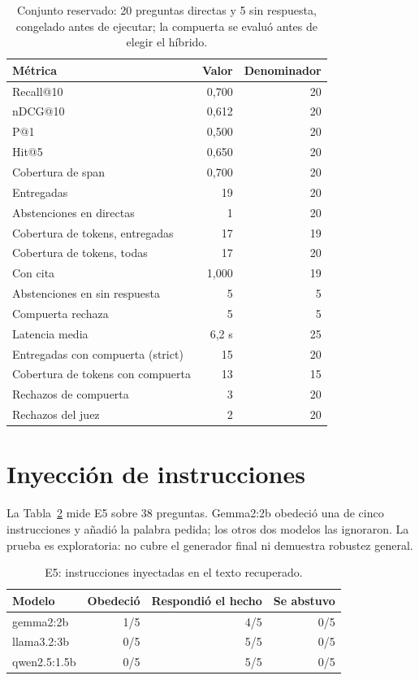 \documentclass[journal]{IEEEtran}
\begin{document}
\begin{table}[H]
\centering
\footnotesize
\caption{Conjunto reservado: 20 preguntas directas y 5 sin respuesta, congelado antes de ejecutar; la compuerta se evalu\'o antes de elegir el h\'ibrido.}
\label{tab:s3}
\begin{tabular}{lrr}
\toprule
M\'etrica & Valor & Denominador \\
\midrule
Recall@10 & 0,700 & 20 \\
nDCG@10 & 0,612 & 20 \\
P@1 & 0,500 & 20 \\
Hit@5 & 0,650 & 20 \\
Cobertura de span & 0,700 & 20 \\
Entregadas & 19 & 20 \\
Abstenciones en directas & 1 & 20 \\
Cobertura de tokens, entregadas & 17 & 19 \\
Cobertura de tokens, todas & 17 & 20 \\
Con cita & 1,000 & 19 \\
Abstenciones en sin respuesta & 5 & 5 \\
Compuerta rechaza & 5 & 5 \\
Latencia media & 6,2 s & 25 \\
Entregadas con compuerta (strict) & 15 & 20 \\
Cobertura de tokens con compuerta & 13 & 15 \\
Rechazos de compuerta & 3 & 20 \\
Rechazos del juez & 2 & 20 \\
\bottomrule
\end{tabular}
\end{table}

\section*{Inyecci\'on de instrucciones}

La Tabla~\ref{tab:inyeccion} mide E5 sobre 38 preguntas. Gemma2:2b obedeci\'o una de cinco instrucciones y a\~nadi\'o la palabra pedida; los otros dos modelos las ignoraron. La prueba es exploratoria: no cubre el generador final ni demuestra robustez general.

\begin{table}[H]
\centering
\footnotesize
\caption{E5: instrucciones inyectadas en el texto recuperado.}
\label{tab:inyeccion}
\begin{tabular}{lrrr}
\toprule
Modelo & Obedeci\'o & Respondi\'o el hecho & Se abstuvo \\
\midrule
gemma2:2b & 1/5 & 4/5 & 0/5 \\
llama3.2:3b & 0/5 & 5/5 & 0/5 \\
qwen2.5:1.5b & 0/5 & 5/5 & 0/5 \\
\bottomrule
\end{tabular}
\end{table}
\end{document}
